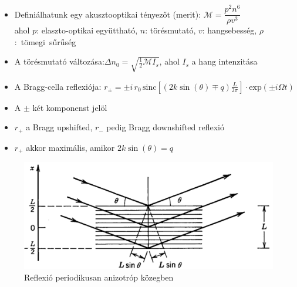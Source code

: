 \documentclass[aspectratio=169]{beamer}
\begin{document}
\begin{frame}
\begin{itemize}
\item Definiálhatunk egy akusztooptikai tényezőt (merit): $\mathcal{M}=\dfrac{p^2n^6}{\rho v^3}$\\ahol $p$: elaszto-optikai együttható, $n$: törésmutató, $v$: hangsebesség, $\rho$:~tömegi~sűrűség
\item A törésmutató változása:$\Delta n_0=\sqrt{\frac{1}{2}\mathcal{M}I_s}$, ahol $I_s$ a hang intenzitása
\end{itemize}
\end{frame}


\begin{frame}
\begin{itemize}
\item A Bragg-cella reflexiója: $r_\pm=\pm i\,r_0\,\mathrm{sinc}\left[(2k\sin(\theta)\mp q)\frac{L}{2\pi}\right]\cdot\mathrm{exp}(\pm i\Omega t)$
\item A $\pm$ két komponenst jelöl
\item $r_+$ a Bragg upshifted, $r_-$ pedig Bragg downshifted reflexió
\item $r_+$ akkor maximális, amikor $2k\sin(\theta)=q$
\end{itemize}
\begin{figure}
\includegraphics[width=.6\textwidth]{reflexio.png}
\caption{Reflexió periodikusan anizotróp közegben}
\end{figure}
\vspace*{-30pt}
\end{frame}
\end{document}
